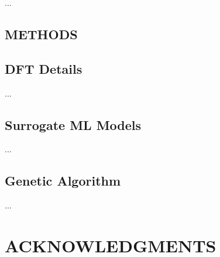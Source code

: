 \documentclass[]{revtex4-2}
\begin{document}
... \\



\begin{methods}


\section*{METHODS}


\subsection*{DFT Details}

... \\




\subsection*{Surrogate ML Models}

... \\


\subsection*{Genetic Algorithm}

... \\


\end{methods}




\section*{ACKNOWLEDGMENTS}
\end{document}
